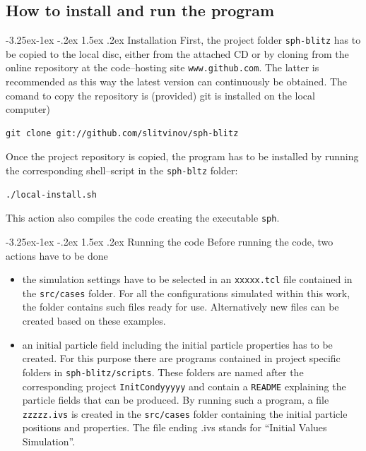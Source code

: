 \documentclass{report}
\makeatletter
\renewcommand\paragraph{\@startsection{paragraph}{4}{\z@}%
  {-3.25ex\@plus -1ex \@minus -.2ex}%
  {1.5ex \@plus .2ex}%
  {\normalfont\normalsize\bfseries}}
\makeatother
\begin{document}
\subsection{How to install and run the program}
\label{sec:HowToInstAndRun2D}
\paragraph{Installation}
First, the project folder {\tt sph-blitz} has to be copied to the local disc, either from the attached CD or by cloning from the online repository at the code--hosting site {\tt www.github.com}. The latter is recommended as this way the latest version can continuously be obtained. The comand to copy the repository is (provided) git is installed on the local computer)
\begin{verbatim}
git clone git://github.com/slitvinov/sph-blitz
\end{verbatim}
Once the project repository is copied, the program has to be installed by running the corresponding shell--script in the {\tt sph-bltz} folder:
\begin{verbatim}
./local-install.sh
\end{verbatim}
This action also compiles the code creating the executable {\tt sph}.

\paragraph{Running the code}
Before running the code, two actions have to be done
\begin{itemize}
 \item the simulation settings have to be selected in an {\tt xxxxx.tcl} file contained in the {\tt src/cases} folder. For all the configurations simulated within this work, the folder contains such files ready for use. Alternatively new files can be created based on these examples.
\item an initial particle field including the initial particle properties has to be created. For this purpose there are programs contained in project specific folders in {\tt sph-blitz/scripts}. These folders are named after the corresponding project {\tt InitCondyyyyy} and contain a {\tt README} explaining the particle fields that can be produced. By running such a program, a file {\tt zzzzz.ivs} is created in the {\tt src/cases} folder containing the initial particle positions and properties.
The file ending .ivs stands for ``Initial Values Simulation''.
 \end{itemize}
\end{document}
